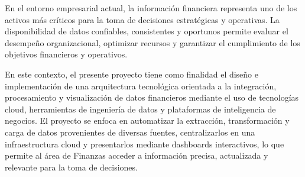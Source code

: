 En el entorno empresarial actual, la información financiera representa uno de los activos más críticos para la toma de decisiones estratégicas y operativas. La disponibilidad de datos confiables, consistentes y oportunos permite evaluar el desempeño organizacional, optimizar recursos y garantizar el cumplimiento de los objetivos financieros y operativos.

En este contexto, el presente proyecto tiene como finalidad el diseño e implementación de una arquitectura tecnológica orientada a la integración, procesamiento y visualización de datos financieros mediante el uso de tecnologías cloud, herramientas de ingeniería de datos y plataformas de inteligencia de negocios. El proyecto se enfoca en automatizar la extracción, transformación y carga de datos provenientes de diversas fuentes, centralizarlos en una infraestructura cloud y presentarlos mediante dashboards interactivos, lo que permite al área de Finanzas acceder a información precisa, actualizada y relevante para la toma de decisiones.
